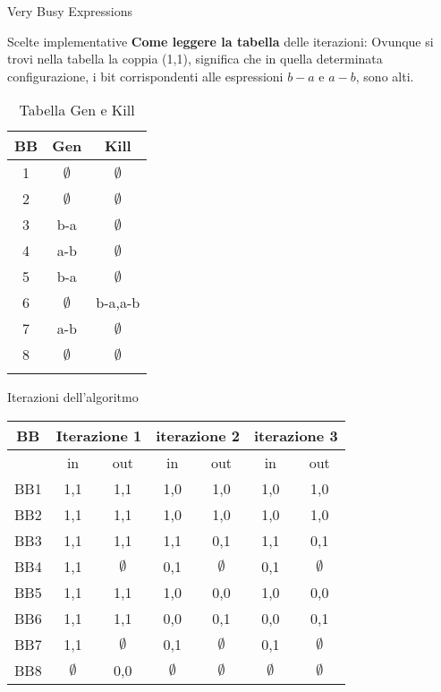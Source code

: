 \documentclass{article}
\begin{document}
\begin{section}{Very Busy Expressions}
\begin{subsection}{Scelte implementative}
	\textbf{Come leggere la tabella} delle iterazioni:
	Ovunque si trovi nella tabella la coppia (1,1), significa che in quella determinata configurazione, i bit corrispondenti alle espressioni $b-a$ e $a-b$, sono alti.

\pagebreak

\begin{longtable}{| c | c | c |}
	\hline
	\textbf{BB} & \textbf{Gen} & \textbf{Kill}\\
	\hline
	1 & $\emptyset$ & $\emptyset$\\
	2 & $\emptyset$&$\emptyset$\\
	3 & b-a &$\emptyset$\\
	4 & a-b&$\emptyset$ \\
	5 & b-a&$\emptyset$\\
	6 & $\emptyset$& b-a,a-b\\
	7 & a-b&$\emptyset$ \\
	8 & $\emptyset$&$\emptyset$\\
	\hline
	\caption{Tabella Gen e Kill}\\
\end{longtable}

\end{subsection}
\begin{subsection}{Iterazioni dell'algoritmo}
	
	\begin{longtable}{| c | c | c | c | c | c | c |}
		\hline
		\textbf{BB} & \multicolumn{2}{|c|}{\textbf{Iterazione 1}} & 	\multicolumn{2}{|c|}{\textbf{iterazione 2}} & 	\multicolumn{2}{|c|}{\textbf{iterazione 3}} \\
		\hline
		\space & in & out & in & out & in & out \\
		\hline
		BB1 & 1,1 & 1,1 & 1,0 & 1,0 & 1,0 & 1,0 \\
		\hline
		BB2 & 1,1 & 1,1 & 1,0 & 1,0 & 1,0 & 1,0 \\
		\hline
		BB3 & 1,1 & 1,1 & 1,1 & 0,1 & 1,1 & 0,1 \\
		\hline
		BB4 & 1,1 & $\emptyset$ & 0,1 & $\emptyset$ & 0,1 & $\emptyset$ \\
		\hline
		BB5 & 1,1 & 1,1 & 1,0 & 0,0 & 1,0 & 0,0 \\
		\hline
		BB6 & 1,1 & 1,1 & 0,0 & 0,1 & 0,0 & 0,1 \\
		\hline
		BB7 & 1,1 & $\emptyset$ & 0,1 & $\emptyset$ & 0,1 & $\emptyset$ \\
		\hline
		BB8 & $\emptyset$ & 0,0 & $\emptyset$ & $\emptyset$ & $\emptyset$ & $\emptyset$ \\
		\hline
	\end{longtable}
\end{subsection}
\end{section}
\end{document}
